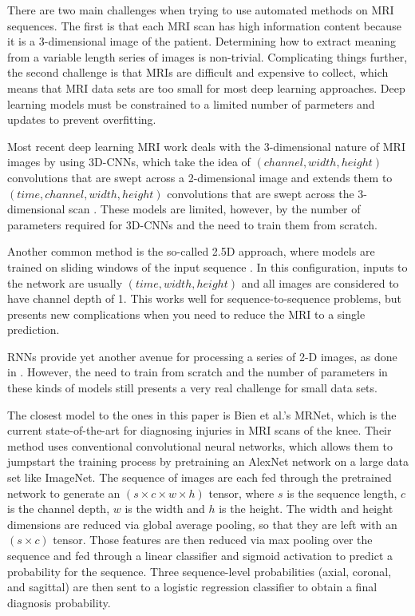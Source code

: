 \documentclass[10pt,twocolumn,letterpaper]{article}
\begin{document}
There are two main challenges when trying to use automated methods on MRI sequences. The first is that each MRI scan has high information content because it is a 3-dimensional image of the patient. Determining how to extract meaning from a variable length series of images is non-trivial. Complicating things further, the second challenge is that MRIs are difficult and expensive to collect, which means that MRI data sets are too small for most deep learning approaches. Deep learning models must be constrained to a limited number of parmeters and updates to prevent overfitting.

Most recent deep learning MRI work deals with the 3-dimensional nature of MRI images by using 3D-CNNs, which take the idea of $(channel, width, height)$ convolutions that are swept across a 2-dimensional image and extends them to $(time, channel, width, height)$ convolutions that are swept across the 3-dimensional scan
\cite{hosseini2016alzheimer,wei2018flair,khvostikov20183d,zou20173d}. These models are limited, however, by the number of parameters required for 3D-CNNs and the need to train them from scratch.

Another common method is the so-called 2.5D approach, where models are trained on sliding windows of the input sequence \cite{roth2015improving,alkadi20182,grovik2019deep}. In this configuration, inputs to the network are usually $(time, width, height)$ and all images are considered to have channel depth of 1. This works well for sequence-to-sequence problems, but presents new complications when you need to reduce the MRI to a single prediction.

RNNs provide yet another avenue for processing a series of 2-D images, as done in \cite{qin2019convolutional,han2018mri}. However, the need to train from scratch and the number of parameters in these kinds of models still presents a very real challenge for small data sets.

The closest model to the ones in this paper is Bien et al.'s MRNet\cite{bien2018deep}, which is the current state-of-the-art for diagnosing injuries in MRI scans of the knee. Their method uses conventional convolutional neural networks, which allows them to jumpstart the training process by pretraining an AlexNet\cite{krizhevsky2012imagenet} network on a large data set like ImageNet\cite{imagenet_cvpr09}. The sequence of images are each fed through the pretrained network to generate an $(s \times c \times w \times h)$ tensor, where $s$ is the sequence length, $c$ is the channel depth, $w$ is the width and $h$ is the height. The width and height dimensions are reduced via global average pooling\cite{lin2013network}, so that they are left with an $(s \times c)$ tensor. Those features are then reduced via max pooling over the sequence and fed through a linear classifier and sigmoid activation to predict a probability for the sequence. Three sequence-level probabilities (axial, coronal, and sagittal) are then sent to a logistic regression classifier to obtain a final diagnosis probability.
\end{document}
